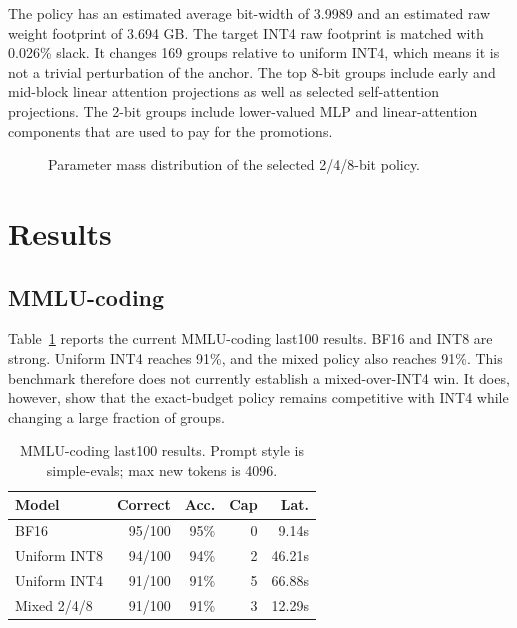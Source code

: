 \documentclass{article}
\begin{document}
The policy has an estimated average bit-width of 3.9989 and an estimated raw weight footprint of 3.694 GB. The target INT4 raw footprint is matched with 0.026\% slack. It changes 169 groups relative to uniform INT4, which means it is not a trivial perturbation of the anchor. The top 8-bit groups include early and mid-block linear attention projections as well as selected self-attention projections. The 2-bit groups include lower-valued MLP and linear-attention components that are used to pay for the promotions.

\begin{figure}[t]
\centering
{}
\caption{Parameter mass distribution of the selected 2/4/8-bit policy.}
\label{fig:policy-mass}
\end{figure}

\section{Results}

\subsection{MMLU-coding}

Table~\ref{tab:mmlu} reports the current MMLU-coding last100 results. BF16 and INT8 are strong. Uniform INT4 reaches 91\%, and the mixed policy also reaches 91\%. This benchmark therefore does not currently establish a mixed-over-INT4 win. It does, however, show that the exact-budget policy remains competitive with INT4 while changing a large fraction of groups.

\begin{table}[t]
\caption{MMLU-coding last100 results. Prompt style is simple-evals; max new tokens is 4096.}
\label{tab:mmlu}
\centering
\footnotesize
\begin{tabular}{lrrrr}
\toprule
Model & Correct & Acc. & Cap & Lat. \\
\midrule
BF16 & 95/100 & 95\% & 0 & 9.14s \\
Uniform INT8 & 94/100 & 94\% & 2 & 46.21s \\
Uniform INT4 & 91/100 & 91\% & 5 & 66.88s \\
Mixed 2/4/8 & 91/100 & 91\% & 3 & 12.29s \\
\bottomrule
\end{tabular}
\end{table}
\end{document}
